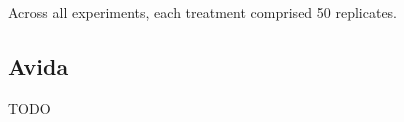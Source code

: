 Across all experiments, each treatment comprised 50 replicates.

\subsection{Avida}

TODO \citep{ofria2004avida}





